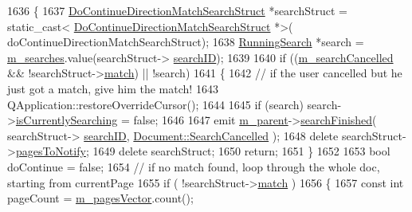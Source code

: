 \begin{DoxyCode}
1636 \{
1637     \hyperlink{structOkular_1_1DoContinueDirectionMatchSearchStruct}{DoContinueDirectionMatchSearchStruct} *searchStruct = \textcolor{keyword}{static\_cast<}
      \hyperlink{structOkular_1_1DoContinueDirectionMatchSearchStruct}{DoContinueDirectionMatchSearchStruct} *\textcolor{keyword}{>}(
      doContinueDirectionMatchSearchStruct);
1638     \hyperlink{structRunningSearch}{RunningSearch} *search = \hyperlink{classOkular_1_1DocumentPrivate_a42420dd45075092b921a829b8e9f2214}{m\_searches}.value(searchStruct->
      \hyperlink{structOkular_1_1DoContinueDirectionMatchSearchStruct_a311791184c19130a099f65f84384db6e}{searchID});
1639 
1640     \textcolor{keywordflow}{if} ((\hyperlink{classOkular_1_1DocumentPrivate_ad852d630ad63f8fd4ce1b2cc93179c91}{m\_searchCancelled} && !searchStruct->\hyperlink{structOkular_1_1DoContinueDirectionMatchSearchStruct_a549890917311bf7520a62da5c6bf0861}{match}) || !search)
1641     \{
1642         \textcolor{comment}{// if the user cancelled but he just got a match, give him the match!}
1643         QApplication::restoreOverrideCursor();
1644 
1645         \textcolor{keywordflow}{if} (search) search->\hyperlink{structRunningSearch_a2683a901cf457f541ca4662294e02cec}{isCurrentlySearching} = \textcolor{keyword}{false};
1646 
1647         emit \hyperlink{classOkular_1_1DocumentPrivate_ac921eda41c014869ffec96ecc569c713}{m\_parent}->\hyperlink{classOkular_1_1Document_ae938c994d20bdfef40caa3d37d28d92d}{searchFinished}( searchStruct->
      \hyperlink{structOkular_1_1DoContinueDirectionMatchSearchStruct_a311791184c19130a099f65f84384db6e}{searchID}, \hyperlink{classOkular_1_1Document_aa9c2934f6abce7b0440ec74bb56eefbbacc76ba5b7c23f4d24515076e946373b4}{Document::SearchCancelled} );
1648         \textcolor{keyword}{delete} searchStruct->\hyperlink{structOkular_1_1DoContinueDirectionMatchSearchStruct_a27dfab7440a3e4889b39307626a6aa7a}{pagesToNotify};
1649         \textcolor{keyword}{delete} searchStruct;
1650         \textcolor{keywordflow}{return};
1651     \}
1652 
1653     \textcolor{keywordtype}{bool} doContinue = \textcolor{keyword}{false};
1654     \textcolor{comment}{// if no match found, loop through the whole doc, starting from currentPage}
1655     \textcolor{keywordflow}{if} ( !searchStruct->\hyperlink{structOkular_1_1DoContinueDirectionMatchSearchStruct_a549890917311bf7520a62da5c6bf0861}{match} )
1656     \{
1657         \textcolor{keyword}{const} \textcolor{keywordtype}{int} pageCount = \hyperlink{classOkular_1_1DocumentPrivate_a73b852d9a73ffe8061b66dbf9b290f17}{m\_pagesVector}.count();

\end{DoxyCode}
